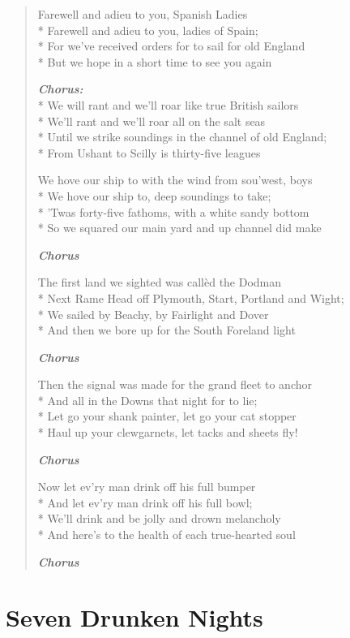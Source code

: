 \documentclass[9pt,twoside]{extarticle}
\newenvironment{xverse}{
	\begin{verse}
	\fontsize{8.5}{10.5}\selectfont
	}
	{
	\end{verse}
	\penalty 0
}
\newcommand{\chorusdef}{\textbf{\emph{Chorus:}}\\*}
\newcommand{\chorusmark}[1][1]{%
\vspace{-0.5\stanzaskip}%
\textbf{\emph{Chorus \ifthenelse{\equal{#1}{1}}{}{$\times$ #1}}}%
\vspace{-0.5\stanzaskip}%
}
\begin{document}
\begin{xverse}
Farewell and adieu to you, Spanish Ladies \\*
Farewell and adieu to you, ladies of Spain; \\*
For we’ve received orders for to sail for old England \\*
But we hope in a short time to see you again

\chorusdef
We will rant and we’ll roar like true British sailors \\*
We’ll rant and we’ll roar all on the salt seas \\*
Until we strike soundings in the channel of old England; \\*
From Ushant to Scilly is thirty-five leagues
 
We hove our ship to with the wind from sou’west, boys \\*
We hove our ship to, deep soundings to take; \\*
’Twas forty-five fathoms, with a white sandy bottom \\*
So we squared our main yard and up channel did make

\chorusmark

The first land we sighted was callèd the Dodman \\*
Next Rame Head off Plymouth, Start, Portland and Wight; \\*
We sailed by Beachy, by Fairlight and Dover \\*
And then we bore up for the South Foreland light

\chorusmark

Then the signal was made for the grand fleet to anchor \\*
And all in the Downs that night for to lie; \\*
Let go your shank painter, let go your cat stopper \\*
Haul up your clewgarnets, let tacks and sheets fly!

\chorusmark

Now let ev’ry man drink off his full bumper \\*
And let ev’ry man drink off his full bowl; \\*
We’ll drink and be jolly and drown melancholy \\*
And here’s to the health of each true-hearted soul

\chorusmark
\end{xverse}

\section{Seven Drunken Nights}
\end{document}
